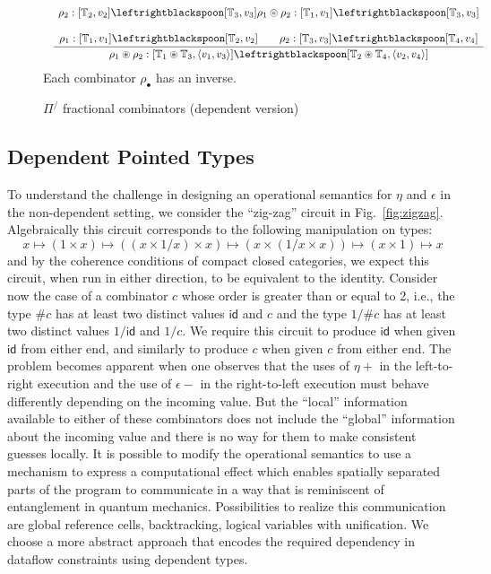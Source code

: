 \documentclass[a4paper,USenglish]{lipics-v2016-utf8x}
\newcommand{\hash}{\#}
\newcommand{\order}[1]{\hash #1}
\newcommand{\iorder}[1]{1/\hash #1}
\newcommand{\Rule}[4]{
\makebox{{\rm #1}
$\displaystyle
\frac{\begin{array}{l}#2\\\end{array}}
{\begin{array}{l}#3\\\end{array}}$
 #4}}
\newcommand{\jdg}[3]{{#1} #3}
\newcommand{\synch}{\mathsf{{synch}}}
\newcommand{\idiso}{\mathsf{{id}}}
\begin{document}
\begin{figure}[t]
{\[\begin{array}{c}
{  \rho_2 :
  [\mathbb{T}_2,v_2] \leftrightblackspoon [\mathbb{T}_3,v_3]}
{\jdg{}{}{\rho_1 \circledcirc \rho_2 :
 [\mathbb{T}_1,v_1] \leftrightblackspoon [\mathbb{T}_3},v_3]}
{}
\\
\\
\Rule{}
{\jdg{}{}{\rho_1 :
 [\mathbb{T}_1,v_1] \leftrightblackspoon
 [\mathbb{T}_2,v_2]}
 \qquad \rho_2 :
 [\mathbb{T}_3,v_3] \leftrightblackspoon
 [\mathbb{T}_4,v_4]}
{\jdg{}{}{\rho_1 \circledast \rho_2 :
  [\mathbb{T}_1 \circledast \mathbb{T}_3, \langle v_1,v_3 \rangle]
  \leftrightblackspoon
  [\mathbb{T}_2 \circledast \mathbb{T}_4}, \langle v_2,v_4 \rangle]}
{}
\end{array}\]
Each combinator $\rho_\bullet$ has an inverse.
}
\caption{$\Pi^/$ fractional combinators (dependent version)}
\label{pifracd:comb}
\end{figure}

\subsection{Dependent Pointed Types}\label{sec:deppointedtypes}

To understand the challenge in designing an operational semantics for $\eta$ and
$\epsilon$ in the non-dependent setting, we consider the ``zig-zag'' circuit in
Fig.~\ref{fig:zigzag}. Algebraically this circuit corresponds to the following
manipulation on types:
\[
x \mapsto (1 \times x) \mapsto ((x \times 1/x) \times x)
\mapsto (x \times (1/x \times x)) \mapsto (x \times 1) \mapsto x
\]
and by the coherence conditions of compact closed categories, we expect this
circuit, when run in either direction, to be equivalent to the
identity. Consider now the case of a combinator $c$ whose order is greater than
or equal to 2, i.e., the type $\order{c}$ has at least two distinct values
$\idiso$ and $c$ and the type $\iorder{c}$ has at least two distinct values
$1/\idiso$ and $1/c$. We require this circuit to produce $\idiso$ when given
$\idiso$ from either end, and similarly to produce $c$ when given $c$ from
either end. The problem becomes apparent when one observes that the uses of
$\eta+$ in the left-to-right execution and the use of $\epsilon-$ in the
right-to-left execution must behave differently depending on the incoming
value. But the ``local'' information available to either of these combinators
does not include the ``global'' information about the incoming value and there
is no way for them to make consistent guesses locally. It is possible to modify
the operational semantics to use a mechanism to express a computational effect
which enables spatially separated parts of the program to communicate in a way
that is reminiscent of entanglement in quantum mechanics. Possibilities to
realize this communication are global reference cells, backtracking, logical
variables with unification. We choose a more abstract approach that encodes the
required dependency in dataflow constraints using dependent types.
\end{document}
